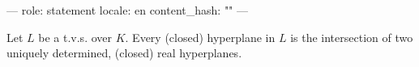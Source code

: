 ---
role: statement
locale: en
content_hash: ""
---

Let $L$ be a t.v.s. over $K$. Every (closed) hyperplane in $L$ is the intersection of two uniquely determined, (closed) real hyperplanes.
